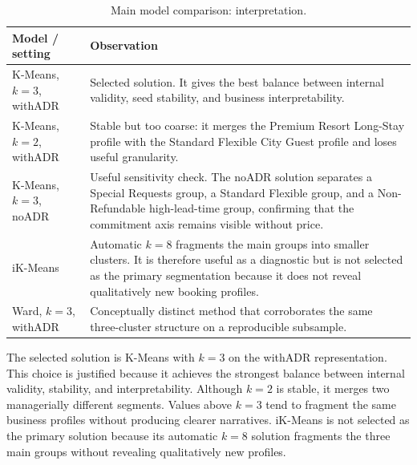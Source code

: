 \documentclass[11pt,a4paper]{article}
\begin{document}
\begin{table}[H]
\centering
\caption{Main model comparison: interpretation.}
\label{tab:model-comparison-notes}
\small
\begin{tabularx}{\textwidth}{p{}X}
\toprule
\textbf{Model / setting} & \textbf{Observation} \\
\midrule

K-Means, $k=3$, withADR &
Selected solution. It gives the best balance between internal validity, seed stability, and business interpretability. \\

K-Means, $k=2$, withADR &
Stable but too coarse: it merges the Premium Resort Long-Stay profile with the Standard Flexible City Guest profile and loses useful granularity. \\

K-Means, $k=3$, noADR &
Useful sensitivity check. The noADR solution separates a Special Requests group, a Standard Flexible group, and a Non-Refundable high-lead-time group, confirming that the commitment axis remains visible without price. \\

iK-Means &
Automatic $k=8$ fragments the main groups into smaller clusters. It is therefore useful as a diagnostic but is not selected as the primary segmentation because it does not reveal qualitatively new booking profiles. \\

Ward, $k=3$, withADR &
Conceptually distinct method that corroborates the same three-cluster structure on a reproducible subsample. \\

\bottomrule
\end{tabularx}
\end{table}

The selected solution is K-Means with $k=3$ on the withADR representation. This choice is justified because it achieves the strongest balance between internal validity, stability, and interpretability. Although $k=2$ is stable, it merges two managerially different segments. Values above $k=3$ tend to fragment the same business profiles without producing clearer narratives. iK-Means is not selected as the primary solution because its automatic $k=8$ solution fragments the three main groups without revealing qualitatively new profiles.
\end{document}
